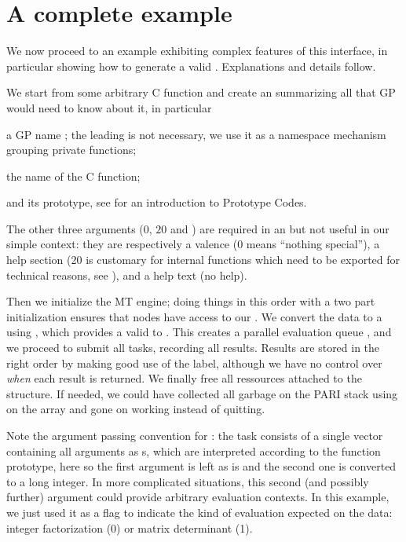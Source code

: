 {\section{A complete example}

We now proceed to an example exhibiting complex features of this
interface, in particular showing how to generate a valid .
Explanations and details follow.


We start from some arbitrary C function  and create an
 summarizing all that GP would need to know about it, in
particular

\item a GP name ; the leading \kbd{\_} is not necessary,
we use it as a namespace mechanism grouping private functions;

\item the name of the C function;

\item and its prototype, see  for an introduction to Prototype
Codes.

\noindent The other three arguments ($0$, $20$ and ) are required in an
 but not useful in our simple context: they are respectively a
valence ($0$ means ``nothing special''), a help section (20 is customary for
internal functions which need to be exported for technical reasons, see
), and a help text (no help).

Then we initialize the MT engine; doing things in this order with a two part
initialization ensures that nodes have access to our . We
convert the  data to a  using , which
provides a valid  to . This creates a
parallel evaluation queue , and we proceed to submit all tasks,
recording all results. Results are stored in the right order
by making good use of the  label, although we have no control
over \emph{when} each result is returned. We finally free all ressources
attached to the  structure. If needed, we could have collected all
garbage on the PARI stack using  on the  array and
gone on working instead of quitting.

Note the argument passing convention for : the task consists of a
single vector containing all arguments as s, which are interpreted
according to the function prototype, here  so the first argument is
left as is and the second one is converted to a long integer. In more
complicated situations, this second (and possibly further) argument could
provide arbitrary evaluation contexts. In this example, we just used it as a
flag to indicate the kind of evaluation expected on the data: integer
factorization (0) or matrix determinant (1).

}
